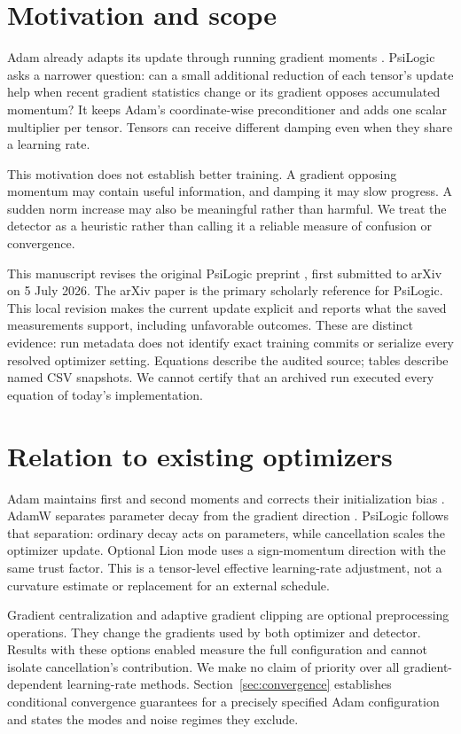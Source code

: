 \documentclass[11pt,a4paper]{article}
\theoremstyle{definition}
\theoremstyle{remark}
\begin{document}
\section{Motivation and scope}

Adam already adapts its update through running gradient moments \citep{kingma2015adam}. PsiLogic asks a narrower question: can a small additional reduction of each tensor's update help when recent gradient statistics change or its gradient opposes accumulated momentum? It keeps Adam's coordinate-wise preconditioner and adds one scalar multiplier per tensor. Tensors can receive different damping even when they share a learning rate.

This motivation does not establish better training. A gradient opposing momentum may contain useful information, and damping it may slow progress. A sudden norm increase may also be meaningful rather than harmful. We treat the detector as a heuristic rather than calling it a reliable measure of confusion or convergence.

This manuscript revises the original PsiLogic preprint \citep{psilogic2026preprint}, first submitted to arXiv on 5 July 2026. The arXiv paper is the primary scholarly reference for PsiLogic. This local revision makes the current update explicit and reports what the saved measurements support, including unfavorable outcomes. These are distinct evidence: run metadata does not identify exact training commits or serialize every resolved optimizer setting. Equations describe the audited source; tables describe named CSV snapshots. We cannot certify that an archived run executed every equation of today's implementation.

\section{Relation to existing optimizers}

Adam maintains first and second moments and corrects their initialization bias \citep{kingma2015adam}. AdamW separates parameter decay from the gradient direction \citep{loshchilov2019decoupled}. PsiLogic follows that separation: ordinary decay acts on parameters, while cancellation scales the optimizer update. Optional Lion mode uses a sign-momentum direction \citep{chen2023lion} with the same trust factor. This is a tensor-level effective learning-rate adjustment, not a curvature estimate or replacement for an external schedule.

Gradient centralization and adaptive gradient clipping are optional preprocessing operations. They change the gradients used by both optimizer and detector. Results with these options enabled measure the full configuration and cannot isolate cancellation's contribution. We make no claim of priority over all gradient-dependent learning-rate methods. Section~\ref{sec:convergence} establishes conditional convergence guarantees for a precisely specified Adam configuration and states the modes and noise regimes they exclude.
\end{document}
